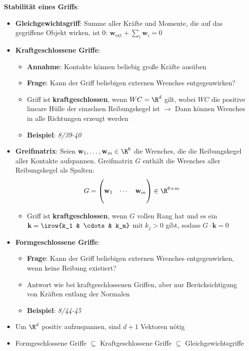 \textbf{Stabilität eines Griffs}:
\begin{itemize}
	\item \textbf{Gleichgewichtsgriff}: Summe aller Kräfte und Momente, die auf das gegriffene Objekt wirken, ist 0: $\mathbf{w}_\text{ext}+\sum\limits_{i} \mathbf{w}_i=0$
	\item \textbf{Kraftgeschlossene Griffe}: 
	\begin{itemize}
		\item \textbf{Annahme}: Kontakte können beliebig große Kräfte ausüben
		\item \textbf{Frage}: Kann der Griff beliebigen externen Wrenches entgegenwirken? 
		\item Griff ist \textbf{kraftgeschlossen}, wenn $WC=\R^d$ gilt, wobei $WC$ die positive lineare Hülle der einzelnen Reibungskegel ist $\rightarrow$ Dann können Wrenches in alle Richtungen erzeugt werden
		\item \textbf{Beispiel}: \textit{8/39-40}
	\end{itemize}
	\item \textbf{Greifmatrix}: Seien $\mathbf{w}_1,\ldots,\mathbf{w}_m\in\R^6$ die Wrenches, die die Reibungskegel aller Kontakte aufspannen. Greifmatrix $G$ enthält die Wrenches aller Reibungskegel als Spalten:
	$$G=\left(
	\begin{matrix}
		 &  \\
		\mathbf{w}_1   & \cdots & \mathbf{w}_m  \\
		 & 
	\end{matrix}
	\right)\in\R^{6\times m}$$
	\begin{itemize}
		\item Griff ist \textbf{kraftgeschlossen}, wenn $G$ vollen Rang hat und es ein $\mathbf{k}=\irow{k_1 & \cdots & k_m}$ mit $k_j>0$ gibt, sodass $G\cdot\mathbf{k}=0$
	\end{itemize}
	\item \textbf{Formgeschlossene Griffe}: 
	\begin{itemize}
		\item \textbf{Frage}: Kann der Griff beliebigen externen Wrenches entgegenwirken, wenn keine Reibung existiert?
		\item Antwort wie bei kraftgeschlossenen Griffen, aber nur Berücksichtigung von Kräften entlang der Normalen
		\item \textbf{Beispiel}: \textit{8/44-45}
	\end{itemize}
	\item Um $\R^d$ positiv aufzuspannen, sind $d+1$ Vektoren nötig
	\item Formgeschlossene Griffe $\subseteq$ Kraftgeschlossene Griffe $\subseteq$ Gleichgewichtsgriffe
\end{itemize}
